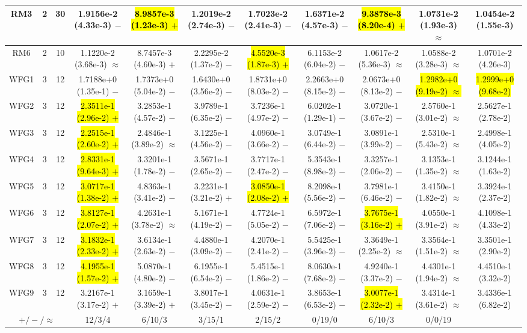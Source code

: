 \documentclass[journal]{IEEEtran}
\begin{document}
\begin{table*}[htbp]
\begin{tabular}{ccccccccccc}
\hline
\multirow{1}{*}{RM3}&2&30&1.9156e-2 (4.33e-3) $-$&\hl{8.9857e-3 (1.23e-3) $+$}&1.2019e-2 (2.74e-3) $-$&1.7023e-2 (2.41e-3) $-$&1.6371e-2 (4.57e-3) $-$&\hl{9.3878e-3 (8.20e-4) $+$}&1.0731e-2 (1.93e-3) $\approx$&1.0454e-2 (1.55e-3)\\
\hline
\multirow{1}{*}{RM6}&2&10&1.1220e-2 (3.68e-3) $\approx$&8.7457e-3 (4.60e-3) $+$&2.2295e-2 (1.37e-2) $-$&\hl{4.5520e-3 (1.87e-3) $+$}&6.1153e-2 (6.04e-2) $-$&1.0617e-2 (5.36e-3) $\approx$&1.0588e-2 (3.28e-3) $\approx$&1.0701e-2 (4.26e-3)\\
\hline
\multirow{1}{*}{WFG1}&3&12&1.7188e+0 (1.35e-1) $-$&1.7373e+0 (5.04e-2) $-$&1.6430e+0 (3.56e-2) $-$&1.8731e+0 (8.03e-2) $-$&2.2663e+0 (8.15e-2) $-$&2.0673e+0 (8.13e-2) $-$&\hl{1.2982e+0 (9.19e-2) $\approx$}&\hl{1.2999e+0 (9.68e-2)}\\
\hline
\multirow{1}{*}{WFG2}&3&12&\hl{2.3511e-1 (2.96e-2) $+$}&3.2853e-1 (4.57e-2) $-$&3.9789e-1 (6.35e-2) $-$&3.7236e-1 (4.97e-2) $-$&6.0202e-1 (1.29e-1) $-$&3.0720e-1 (3.67e-2) $-$&2.5760e-1 (3.01e-2) $\approx$&2.5627e-1 (2.78e-2)\\
\hline
\multirow{1}{*}{WFG3}&3&12&\hl{2.2515e-1 (2.60e-2) $+$}&2.4846e-1 (3.89e-2) $\approx$&3.1225e-1 (4.56e-2) $-$&4.0960e-1 (3.66e-2) $-$&3.0749e-1 (6.44e-2) $-$&3.0891e-1 (3.99e-2) $-$&2.5310e-1 (5.43e-2) $\approx$&2.4998e-1 (4.05e-2)\\
\hline
\multirow{1}{*}{WFG4}&3&12&\hl{2.8331e-1 (9.64e-3) $+$}&3.3201e-1 (1.78e-2) $-$&3.5671e-1 (2.65e-2) $-$&3.7717e-1 (2.47e-2) $-$&5.3543e-1 (8.98e-2) $-$&3.3257e-1 (2.06e-2) $-$&3.1353e-1 (1.35e-2) $\approx$&3.1244e-1 (1.63e-2)\\
\hline
\multirow{1}{*}{WFG5}&3&12&\hl{3.0717e-1 (1.38e-2) $+$}&4.8363e-1 (3.41e-2) $-$&3.2231e-1 (3.21e-2) $+$&\hl{3.0850e-1 (2.08e-2) $+$}&8.2098e-1 (5.56e-2) $-$&3.7981e-1 (6.46e-2) $-$&3.4150e-1 (1.82e-2) $\approx$&3.3924e-1 (2.37e-2)\\
\hline
\multirow{1}{*}{WFG6}&3&12&\hl{3.8127e-1 (2.07e-2) $+$}&4.2631e-1 (3.78e-2) $\approx$&5.1671e-1 (4.19e-2) $-$&4.7724e-1 (5.05e-2) $-$&6.5972e-1 (7.06e-2) $-$&\hl{3.7675e-1 (3.16e-2) $+$}&4.0550e-1 (3.91e-2) $\approx$&4.1098e-1 (4.33e-2)\\
\hline
\multirow{1}{*}{WFG7}&3&12&\hl{3.1832e-1 (2.33e-2) $+$}&3.6134e-1 (2.63e-2) $-$&4.4880e-1 (3.09e-2) $-$&4.2070e-1 (2.41e-2) $-$&5.5425e-1 (3.96e-2) $-$&3.3649e-1 (2.25e-2) $\approx$&3.3564e-1 (1.51e-2) $\approx$&3.3501e-1 (2.90e-2)\\
\hline
\multirow{1}{*}{WFG8}&3&12&\hl{4.1955e-1 (1.57e-2) $+$}&5.0870e-1 (4.80e-2) $-$&6.1955e-1 (6.54e-2) $-$&5.4515e-1 (1.86e-2) $-$&8.0630e-1 (7.68e-2) $-$&4.9240e-1 (3.37e-2) $-$&4.4301e-1 (1.94e-2) $\approx$&4.4510e-1 (3.32e-2)\\
\hline
\multirow{1}{*}{WFG9}&3&12&3.2167e-1 (3.17e-2) $+$&3.1659e-1 (3.39e-2) $+$&3.8017e-1 (3.45e-2) $-$&4.0631e-1 (2.59e-2) $-$&3.8653e-1 (6.53e-2) $-$&\hl{3.0077e-1 (2.32e-2) $+$}&3.4314e-1 (3.61e-2) $\approx$&3.4336e-1 (6.82e-2)\\
\hline
\multicolumn{3}{c}{$+/-/\approx$}&12/3/4&6/10/3&3/15/1&2/15/2&0/19/0&6/10/3&0/0/19&\\
\bottomrule
\end{tabular}
\label{No Label}
\end{table*}
\end{document}

